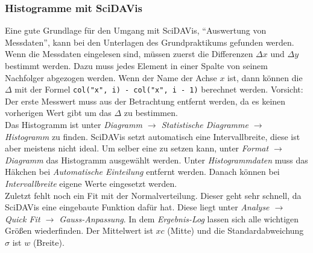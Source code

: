\subsubsection*{Histogramme mit SciDAVis}
Eine gute Grundlage für den Umgang mit SciDAVis, ``Auswertung von Messdaten'', kann bei den Unterlagen des Grundpraktikums gefunden werden.\\
Wenn die Messdaten eingelesen sind, müssen zuerst die Differenzen $\Delta x$ und $\Delta y$ bestimmt werden. Dazu muss jedes Element in einer Spalte von seinem Nachfolger abgezogen werden. Wenn der Name der Achse $x$ ist, dann können die $\Delta$ mit der Formel \verb|col("x", i) - col("x", i - 1)| berechnet werden. Vorsicht: Der erste Messwert muss aus der Betrachtung entfernt werden, da es keinen vorherigen Wert gibt um das $\Delta$ zu bestimmen.\\
Das Histogramm ist unter \emph{Diagramm $\rightarrow$ Statistische Diagramme $\rightarrow$ Histogramm} zu finden. SciDAVis setzt automatisch eine Intervallbreite, diese ist aber meistens nicht ideal. Um selber eine zu setzen kann, unter \emph{Format $\rightarrow$ Diagramm} das Histogramm ausgewählt werden. Unter \emph{Histogrammdaten} muss das Häkchen bei \emph{Automatische Einteilung} entfernt werden. Danach können bei \emph{Intervallbreite} eigene Werte eingesetzt werden.\\
Zuletzt fehlt noch ein Fit mit der Normalverteilung. Dieser geht sehr schnell, da SciDAVis eine eingebaute Funktion dafür hat. Diese liegt unter \emph{Analyse $\rightarrow$ Quick Fit $\rightarrow$ Gauss-Anpassung}. In dem \emph{Ergebnis-Log} lassen sich alle wichtigen Größen wiederfinden. Der Mittelwert ist $xc$ (Mitte) und die Standardabweichung $\sigma$ ist $w$ (Breite).
